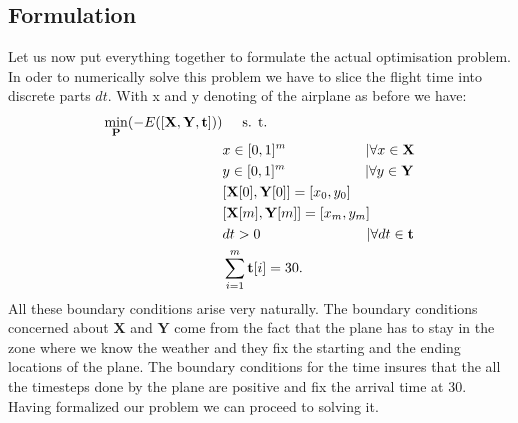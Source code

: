 \subsection{Formulation}

Let us now put everything together to formulate the actual optimisation problem. In oder to numerically solve this problem we have to slice the flight time into discrete parts $dt$. With x and y denoting of the airplane as before we have:
\begin{align*}
\min_{\mathbf{P} }( -E(\left[\mathbf{X},\mathbf{Y},\mathbf{t} \right] )) & \hspace{5mm} \text{s. t. } \\
& x \in [0,1]^m \hspace{20mm} | \forall x \in \mathbf{X}\\
& y \in [0,1]^m \hspace{20mm} | \forall y \in \mathbf{Y}\\
& [\mathbf{X}[0],\mathbf{Y}[0]] = [x_0,y_0] \\
& [\mathbf{X}[m],\mathbf{Y}[m]] = [x_m,y_m] \\
& dt > 0 \hspace{26.7mm} | \forall dt \in \mathbf{t}\\
& \sum_{i=1}^m \mathbf{t}[i] = 30 .
\end{align*}
All these boundary conditions arise very naturally.
The boundary conditions concerned about $ \mathbf{X} $ and $ \mathbf{Y} $ come from the fact that the plane has to stay in the zone where we know the weather and they fix the starting and the ending locations of the plane.
The boundary conditions for the time insures that the all the timesteps done by the plane are positive and fix the arrival time at 30.
Having formalized our problem we can proceed to solving it.

